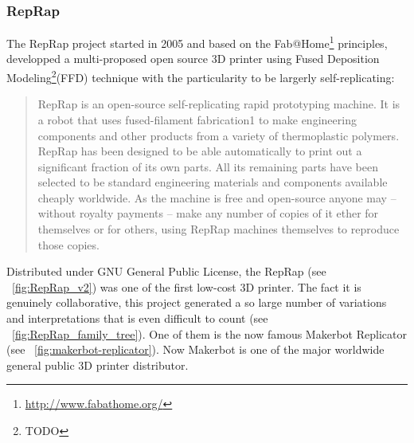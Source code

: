 \subsubsection{RepRap} %

The RepRap project started in 2005 and based on the Fab@Home\footnote{\url{http://www.fabathome.org/}} principles, developped a multi-proposed open source 3D printer using Fused Deposition Modeling\footnote{TODO}(FFD) technique with the particularity to be largerly self-replicating:

\begin{quotation}
    RepRap is an open-source self-replicating rapid prototyping machine. It is a robot that uses fused-filament fabrication1 to make engineering components and other products from a variety of thermoplastic polymers. RepRap has been designed to be able automatically to print out a significant fraction of its own parts. All its remaining parts have been selected to be standard engineering materials and components available cheaply worldwide. As the machine is free and open-source anyone may – without royalty payments – make any number of copies of it ether for themselves or for others, using RepRap machines themselves to reproduce those copies.

\end{quotation}


\begin{figure}[]
\centering
    \hfil
    \caption{}
    \label{fig:RepRap_project}
\end{figure}


Distributed under GNU General Public License, the RepRap (see \figurename~\ref{fig:RepRap_v2}) was one of the first low-cost 3D printer. The fact it is genuinely collaborative, this project generated a so large number of variations and interpretations that is even difficult to count (see \figurename~\ref{fig:RepRap_family_tree}). One of them is the now famous Makerbot Replicator (see \figurename~\ref{fig:makerbot-replicator}). Now Makerbot is one of the major worldwide general public 3D printer distributor.
